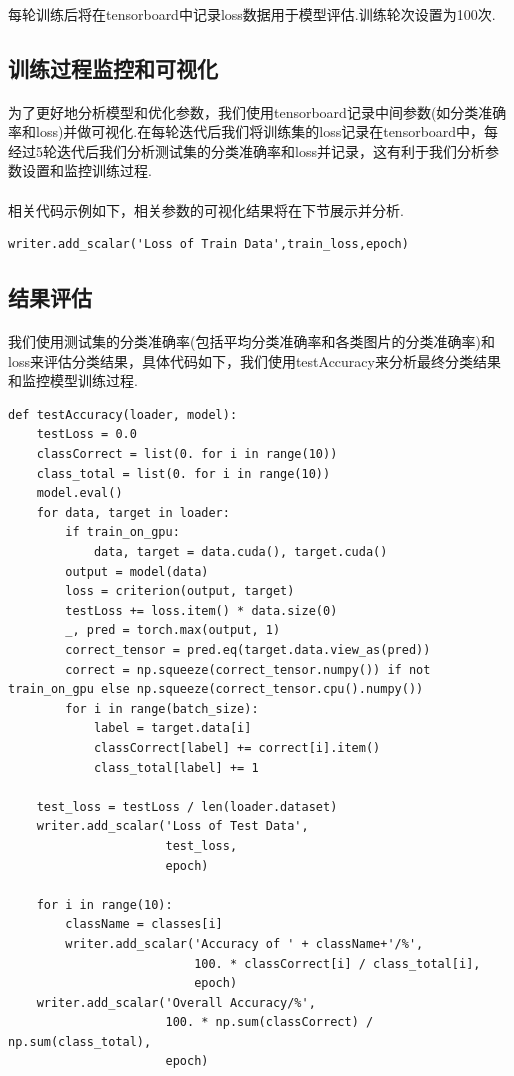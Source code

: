 \documentclass[11pt]{article}
\begin{document}
\paragraph{}每轮训练后将在tensorboard中记录loss数据用于模型评估.训练轮次设置为100次.

\subsection{训练过程监控和可视化}
\paragraph{}为了更好地分析模型和优化参数，我们使用tensorboard记录中间参数(如分类准确率和loss)并做可视化.在每轮迭代后我们将训练集的loss记录在tensorboard中，每经过5轮迭代后我们分析测试集的分类准确率和loss并记录，这有利于我们分析参数设置和监控训练过程.
\paragraph{}相关代码示例如下，相关参数的可视化结果将在下节展示并分析.
\begin{verbatim}
writer.add_scalar('Loss of Train Data',train_loss,epoch)
\end{verbatim}

\subsection{结果评估}
\paragraph{}我们使用测试集的分类准确率(包括平均分类准确率和各类图片的分类准确率)和loss来评估分类结果，具体代码如下，我们使用testAccuracy来分析最终分类结果和监控模型训练过程.
\begin{verbatim}
def testAccuracy(loader, model):
    testLoss = 0.0
    classCorrect = list(0. for i in range(10))
    class_total = list(0. for i in range(10))
    model.eval()
    for data, target in loader:
        if train_on_gpu:
            data, target = data.cuda(), target.cuda()
        output = model(data)
        loss = criterion(output, target)
        testLoss += loss.item() * data.size(0)
        _, pred = torch.max(output, 1)
        correct_tensor = pred.eq(target.data.view_as(pred))
        correct = np.squeeze(correct_tensor.numpy()) if not train_on_gpu else np.squeeze(correct_tensor.cpu().numpy())
        for i in range(batch_size):
            label = target.data[i]
            classCorrect[label] += correct[i].item()
            class_total[label] += 1

    test_loss = testLoss / len(loader.dataset)
    writer.add_scalar('Loss of Test Data',
                      test_loss,
                      epoch)

    for i in range(10):
        className = classes[i]
        writer.add_scalar('Accuracy of ' + className+'/%',
                          100. * classCorrect[i] / class_total[i],
                          epoch)
    writer.add_scalar('Overall Accuracy/%',
                      100. * np.sum(classCorrect) / np.sum(class_total),
                      epoch)
\end{verbatim}
\end{document}
